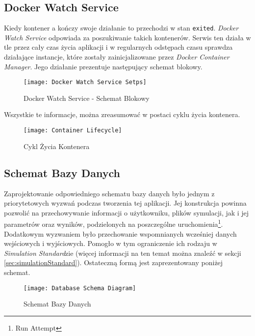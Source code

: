 \subsection{Docker Watch Service}
\label{sec:dockerWatchService}

\par Kiedy kontener \emph{\docker{}}a kończy swoje działanie to przechodzi w stan \texttt{exited}. \emph{Docker Watch Service} odpowiada za poszukiwanie takich kontenerów. Serwis ten działa w tle przez cały czas życia aplikacji i w regularnych odstępach czasu sprawdza działające instancje, które zostały zainicjalizowane przez \emph{Docker Container Manager}. Jego działanie prezentuje następujący schemat blokowy.

\begin{figure}[H]
	\texttt{[image: Docker Watch Service Setps]}
	\caption{Docker Watch Service - Schemat Blokowy}
\end{figure}

\par Wszystkie te informacje, można zreasumować w postaci cyklu życia kontenera.

\begin{figure}[H]
	\texttt{[image: Container Lifecycle]}
	\caption{Cykl Życia Kontenera}
\end{figure}

\subsection{Schemat Bazy Danych}

\par Zaprojektowanie odpowiedniego schematu bazy danych było jednym z priorytetowych wyzwań podczas tworzenia tej aplikacji. Jej konstrukcja powinna pozwolić na przechowywanie informacji o użytkowniku, plików symulacji, jak i jej parametrów oraz wyników, podzielonych na poszczególne uruchomienia\footnote{Run Attempt}. Dodatkowym wyzwaniem było przechowanie wspomnianych wcześniej danych wejściowych i wyjściowych. Pomogło w tym ograniczenie ich rodzaju w \emph{Simulation Standard}zie (więcej informacji na ten temat można znaleźć w sekcji \ref{sec:simulationStandard}). Ostateczną formą jest zaprezentowany poniżej schemat.

\begin{figure}[H]
	\texttt{[image: Database Schema Diagram]}
	\caption{Schemat Bazy Danych}
\end{figure}

